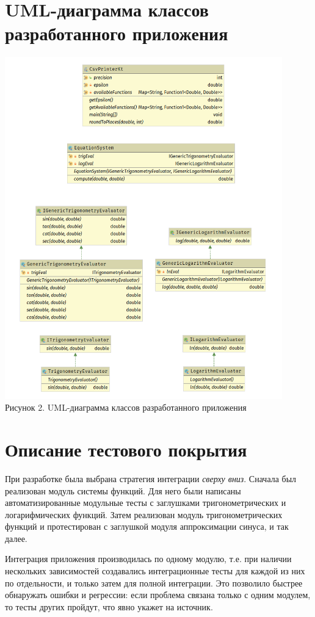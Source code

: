 \documentclass[listings]{labreport}
\begin{document}
\section*{UML-диаграмма классов разработанного приложения}

\begin{center}
\includegraphics[width=0.9\textwidth]{Lab2_uml.png}\\
Рисунок 2. UML-диаграмма классов разработанного приложения
\end{center}

\newpage
\section*{Описание тестового покрытия}

При разработке была выбрана стратегия интеграции \textit{сверху вниз}. Сначала был реализован модуль
системы функций. Для него были написаны автоматизированные модульные тесты с заглушками тригонометрических
и логарифмических функций. Затем реализован модуль тригонометрических функций и протестирован с заглушкой
модуля аппроксимации синуса, и так далее.

Интеграция приложения производилась по одному модулю, т.е. при наличии нескольких зависимостей создавались
интеграционные тесты для каждой из них по отдельности, и только затем для полной интеграции. Это позволило
быстрее обнаружать ошибки и регрессии: если проблема связана только с одним модулем, то тесты других пройдут,
что явно укажет на источник.
\end{document}
